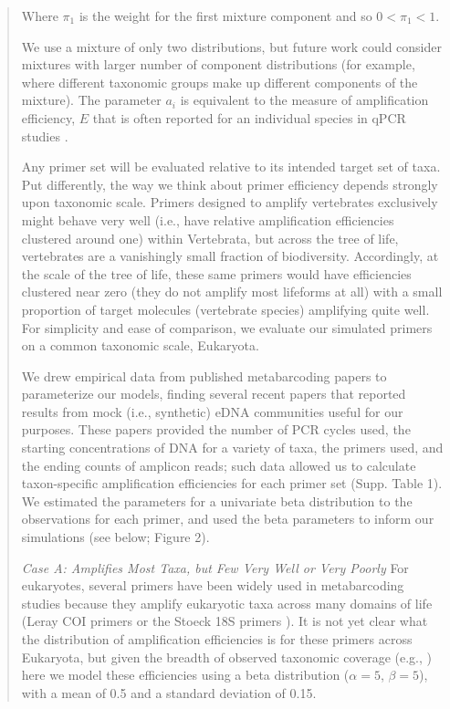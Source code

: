 \documentclass[fleqn,11pt,lineno]{wlscirep}
\begin{document}
\begin{quote}
		Where $\pi_1$ is the weight for the first mixture component and so $0 < \pi_1 < 1 $. 
		
We use a mixture of only two distributions, but future work could consider mixtures with larger number of component distributions (for example, where different taxonomic groups make up different components of the mixture). The parameter $a_i$ is equivalent to the measure of amplification efficiency, $E$ that is often reported for an individual species in qPCR studies \cite{Ruitger2009}.

Any primer set will be evaluated relative to its intended target set of taxa. Put differently, the way we think about primer efficiency depends strongly upon taxonomic scale. Primers designed to amplify vertebrates exclusively might behave very well (i.e., have relative amplification efficiencies clustered around one) within Vertebrata, but across the tree of life, vertebrates are a vanishingly small fraction of biodiversity. Accordingly, at the scale of the tree of life, these same primers would have efficiencies clustered near zero (they do not amplify most lifeforms at all) with a small proportion of target molecules (vertebrate species) amplifying quite well. For simplicity and ease of comparison, we evaluate our simulated primers on a common taxonomic scale, Eukaryota. 

We drew empirical data from published metabarcoding papers to parameterize our models, finding several recent papers \cite{hanfling2016environmental, port2016assessing, deiner2016environmental, olds2016estimating, ford2016estimation, braukmann2019} that reported results from mock (i.e., synthetic) eDNA communities useful for our purposes. These papers provided the number of PCR cycles used, the starting concentrations of DNA for a variety of taxa, the primers used, and the ending counts of amplicon reads; such data allowed us to calculate taxon-specific amplification efficiencies for each primer set (Supp. Table 1). We estimated the  parameters for a univariate beta distribution to the observations for each primer, and used the beta parameters to inform our simulations (see below; Figure 2).

\textit{Case A: Amplifies Most Taxa, but Few Very Well or Very Poorly} 
	For eukaryotes, several primers have been widely used in metabarcoding studies because they amplify eukaryotic taxa across many domains of life (Leray COI primers \cite{leray_new_2013} or the Stoeck 18S primers \cite{stoeck_multiple_2010}). It is not yet clear what the distribution of amplification efficiencies is for these primers across Eukaryota, but given the breadth of observed taxonomic coverage (e.g., \cite{leray_dna_2015, kelly2017multilocus}) here we model these efficiencies using a beta distribution ($\alpha=5$, $\beta=5$), with a mean of 0.5 and a standard deviation of 0.15. 	


\end{quote}
\end{document}

